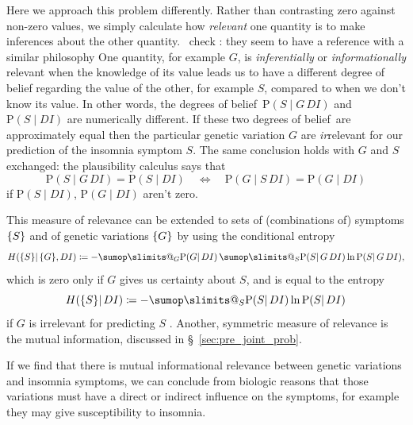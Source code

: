 \documentclass[\ifafour a4paper,12pt,\else a5paper,10pt,\fi%
onecolumn,oneside,article,%
british%
]{memoir}
\makeatletter
\theoremstyle{remark}
\theoremstyle{innote}
\def\sum{\DOTSI\sumop\slimits@}
\newcommand*{\citep}{\parencites}
\newcommand*{\defd}{\coloneqq}
\DeclarePairedDelimiter\set{\{}{\}}
\newcommand*{\p}{\mathrm{P}}%
\renewcommand*{\|}{\mathpunct{|}}
\newcommand*{\sect}{\S}%
\newcommand*{\chap}{ch.}%
\newcommand*{\puzzle}{\maltese}
\newcommand{\mynote}[1]{ {\color{notecolour}\puzzle\ #1}}
\newcommand*{\dobs}{degrees of belief}
\newcommand*{\yD}{D}
\newcommand*{\yG}{G}
\newcommand*{\yS}{S}
\newcommand*{\yI}{I}
\newcommand*{\sH}{H}
\makeatother
\begin{document}
Here we approach this problem differently. Rather than contrasting zero
against non-zero values, we simply calculate how \emph{relevant} one
quantity is to make inferences about the other quantity.\mynote{check
  \citep{stephensetal2009}: they seem to have a reference with a similar
  philosophy} One quantity, for example $\yG$, is \emph{inferentially} or
\emph{informationally} relevant when the knowledge of its value leads us to
have a different degree of belief regarding the value of the other, for
example $\yS$, compared to when we don't know its value. In other words,
the \dobs\ $\p(\yS \| \yG \,\yD \yI)$ and $\p(\yS \| \yD \yI)$ are
numerically different. If these two \dobs\ are approximately equal
then the particular genetic variation $\yG$ are \emph{ir}relevant for our
prediction of the insomnia symptom $\yS$. The same conclusion holds with
$\yG$ and $\yS$ exchanged: the plausibility calculus says that
\begin{equation}
  \label{eq:pre_exchange_irrelevance}
  \p(\yS \| \yG \,\yD \yI) = \p(\yS \| \yD \yI)
  \quad\Longleftrightarrow\quad
    \p(\yG \| \yS \,\yD \yI) = \p(\yG \| \yD \yI)
\end{equation}
if $\p(\yS \| \yD \yI)$, $\p(\yG \| \yD \yI)$ aren't zero.

This measure of relevance can be extended to sets of (combinations of)
symptoms $\set{\yS}$ and of genetic variations $\set{\yG}$ by using the
conditional entropy
\citep{shannon1948,kelly1956}[\sect~14.7]{pressetal1988_r2007}[\chap~2]{coveretal1991_r2006}
\begin{equation}
  \label{eq:pre_conditional_entropy}
  \sH(\set{\yS} \| \set{\yG}, \yD\yI) \defd
  -\sum_{\yG} \p(\yG \| \yD\yI)\,
  \sum_{\yS} \p(\yS \|\yG\,\yD\yI) \ln\p(\yS \|\yG\,\yD\yI),
\end{equation}
which is zero only if $\yG$ gives us certainty about $\yS$, and is equal to
the entropy 
\begin{equation}
  \sH(\set{\yS} \| \yD\yI) \defd
-\sum_{\yS}\p(\yS \|\yD\yI) \ln\p(\yS \|\yD\yI)
  \label{eq:pre_entropy_G}
\end{equation}
if $\yG$ is irrelevant for predicting $\yS$
\citep[\sect~14.7]{pressetal1988_r2007}[\chap~2]{coveretal1991_r2006}.
Another, symmetric measure of relevance is the mutual information,
discussed in \sect~\ref{sec:pre_joint_prob}.

If we find that there is mutual informational relevance between genetic
variations and insomnia symptoms, we can conclude from biologic reasons
that those variations must have a direct or indirect influence on the
symptoms, for example they may give susceptibility to insomnia.
\end{document}

